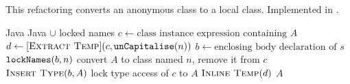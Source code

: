 \subsection{}
This refactoring converts an anonymous class to a local class. Implemented in .

\begin{algorithm}
\caption{$\refactoring{Convert Anonymous to Local}(A : \type{AnonymousClass}, n : \type{Name}) : \type{LocalClass}$}
\begin{algorithmic}[1]
\REQUIRE Java
\ENSURE Java $\cup$ locked names
\medskip
\STATE $c \leftarrow \text{class instance expression containing $A$}$
\STATE $d \leftarrow [\textsc{Extract Temp}](c, \text{\texttt{unCapitalise}}(n))$
\STATE $b \leftarrow \text{enclosing body declaration of $s$}$
\STATE $\text{\texttt{lockNames}}(b, n)$
\STATE convert $A$ to class named $n$, remove it from $c$
\STATE $\textsc{Insert Type}(b, A)$
\STATE lock type access of $c$ to $A$
\STATE $\textsc{Inline Temp}(d)$
\RETURN $A$
\end{algorithmic}
\end{algorithm}
